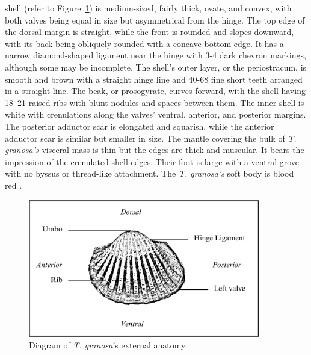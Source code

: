 \textit{\Tgranosa} shell (refer to Figure~\ref{fig:anatomy}) is medium-sized, fairly thick, ovate, and convex, with both valves being equal in size but asymmetrical from the hinge. The top edge of the dorsal margin is straight, while the front is rounded and slopes downward, with its back being obliquely rounded with a concave bottom edge. It has a narrow diamond-shaped ligament near the hinge with 3-4 dark chevron markings, although some may be incomplete. The shell’s outer layer, or the periostracum, is smooth and brown with a straight hinge line and 40-68 fine short teeth arranged in a straight line. The beak, or prosogyrate, curves forward, with the shell having 18–21 raised ribs with blunt nodules and spaces between them. The inner shell is white with crenulations along the valves' ventral, anterior, and posterior margins. The posterior adductor scar is elongated and squarish, while the anterior adductor scar is similar but smaller in size. The mantle covering the bulk of \textit{T. granosa’s} visceral mass is thin but the edges are thick and muscular. It bears the impression of the crenulated shell edges. Their foot is large with a ventral grove with no byssus or thread-like attachment. The  \textit{T. granosa’s} soft body is blood red \cite{narasimham1988}.  

\newpage
\begin{figure}[!htbp]
	\centering
	\includegraphics[width=0.9\textwidth]{figures/anatomy.png}
	\caption{Diagram of \textit{T. granosa}'s external anatomy.}
	\label{fig:anatomy}
\end{figure}


